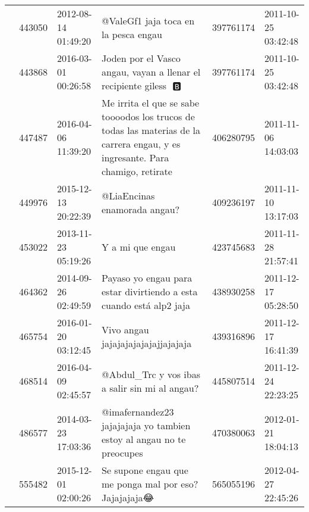 \begin{tabular}{llllrl}
           & 443050  & 2012-08-14 01:49:20 &                                                                                                         @ValeGf1 jaja toca en la pesca engau &   397761174 & 2011-10-25 03:42:48 \\
           & 443868  & 2016-03-01 00:26:58 &                                                                             Joden por el Vasco angau, vayan a llenar el recipiente giless 👻🅱 &   397761174 & 2011-10-25 03:42:48 \\
           & 447487  & 2016-04-06 11:39:20 &              Me irrita el que se sabe toooodos los trucos de todas las materias de la carrera engau, y es ingresante. Para chamigo, retirate &   406280795 & 2011-11-06 14:03:03 \\
           & 449976  & 2015-12-13 20:22:39 &                                                                                                                 @LiaEncinas enamorada angau? &   409236197 & 2011-11-10 13:17:03 \\
           & 453022  & 2013-11-23 05:19:26 &                                                                                                                             Y a mi que engau &   423745683 & 2011-11-28 21:57:41 \\
           & 464362  & 2014-09-26 02:49:59 &                                                                          Payaso yo engau para estar divirtiendo a esta cuando está alp2 jaja &   438930258 & 2011-12-17 05:28:50 \\
           & 465754  & 2016-01-20 03:12:45 &                                                                                                           Vivo angau jajajajajajajajjajajaja &   439316896 & 2011-12-17 16:41:39 \\
           & 468514  & 2016-04-09 02:45:57 &                                                                                               @Abdul\_Trc y vos ibas a salir sin mi al angau? &   445807514 & 2011-12-24 22:23:25 \\
           & 486577  & 2014-03-23 17:03:36 &                                                                         @imafernandez23 jajajajaja yo tambien estoy al angau no te preocupes &   470380063 & 2012-01-21 18:04:13 \\
           & 555482  & 2015-12-01 02:00:26 &                                                                                        Se supone engau que me ponga mal por eso? Jajajajaja😂 &   565055196 & 2012-04-27 22:45:26 \\

\end{tabular}
